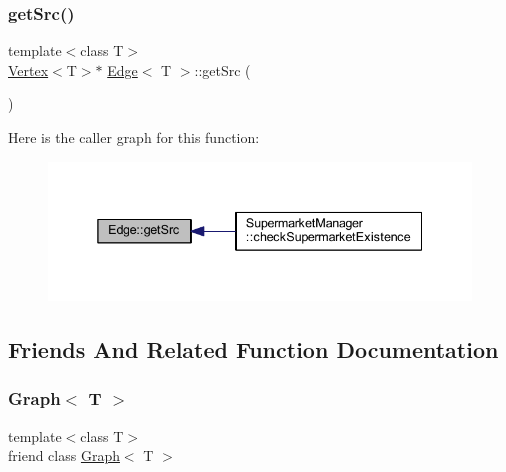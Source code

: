 \subsubsection{\texorpdfstring{get\+Src()}{getSrc()}}
{\footnotesize\ttfamily template$<$class T$>$ \\
\hyperlink{class_vertex}{Vertex}$<$T$>$$\ast$ \hyperlink{class_edge}{Edge}$<$ T $>$\+::get\+Src (\begin{DoxyParamCaption}{ }\end{DoxyParamCaption})\hspace{0.3cm}{\ttfamily [inline]}}

Here is the caller graph for this function\+:
\nopagebreak
\begin{figure}[H]
\begin{center}
\leavevmode
\includegraphics[width=338pt]{class_edge_a2645a9ac350e79626dc5472714b3b3b1_icgraph}
\end{center}
\end{figure}


\subsection{Friends And Related Function Documentation}
\mbox{\label{class_edge_aefa9b76cd57411c5354e5620dc2d84dd}} 
\subsubsection{\texorpdfstring{Graph$<$ T $>$}{Graph< T >}}
{\footnotesize\ttfamily template$<$class T$>$ \\
friend class \hyperlink{class_graph}{Graph}$<$ T $>$\hspace{0.3cm}{\ttfamily [friend]}}

\mbox{\label{class_edge_a2e120a12dec663fa334633b4f26cbed8}} 
